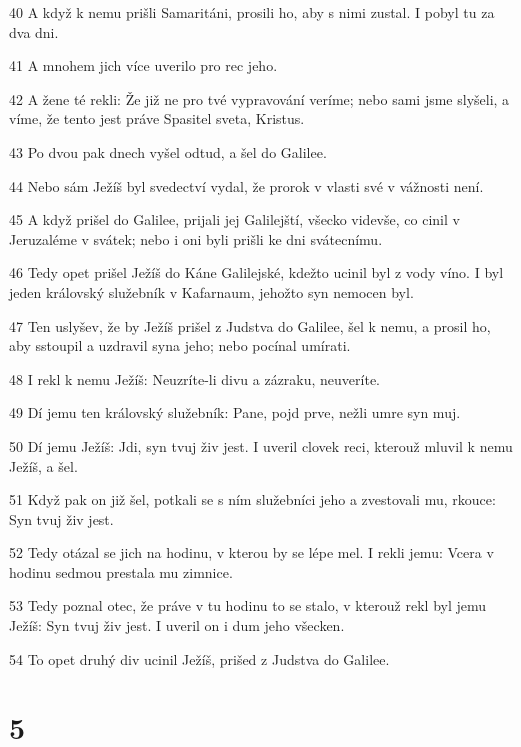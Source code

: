 \par 40 A když k nemu prišli Samaritáni, prosili ho, aby s nimi zustal. I pobyl tu za dva dni.
\par 41 A mnohem jich více uverilo pro rec jeho.
\par 42 A žene té rekli: Že již ne pro tvé vypravování veríme; nebo sami jsme slyšeli, a víme, že tento jest práve Spasitel sveta, Kristus.
\par 43 Po dvou pak dnech vyšel odtud, a šel do Galilee.
\par 44 Nebo sám Ježíš byl svedectví vydal, že prorok v vlasti své v vážnosti není.
\par 45 A když prišel do Galilee, prijali jej Galilejští, všecko videvše, co cinil v Jeruzaléme v svátek; nebo i oni byli prišli ke dni svátecnímu.
\par 46 Tedy opet prišel Ježíš do Káne Galilejské, kdežto ucinil byl z vody víno. I byl jeden královský služebník v Kafarnaum, jehožto syn nemocen byl.
\par 47 Ten uslyšev, že by Ježíš prišel z Judstva do Galilee, šel k nemu, a prosil ho, aby sstoupil a uzdravil syna jeho; nebo pocínal umírati.
\par 48 I rekl k nemu Ježíš: Neuzríte-li divu a zázraku, neuveríte.
\par 49 Dí jemu ten královský služebník: Pane, pojd prve, nežli umre syn muj.
\par 50 Dí jemu Ježíš: Jdi, syn tvuj živ jest. I uveril clovek reci, kterouž mluvil k nemu Ježíš, a šel.
\par 51 Když pak on již šel, potkali se s ním služebníci jeho a zvestovali mu, rkouce: Syn tvuj živ jest.
\par 52 Tedy otázal se jich na hodinu, v kterou by se lépe mel. I rekli jemu: Vcera v hodinu sedmou prestala mu zimnice.
\par 53 Tedy poznal otec, že práve v tu hodinu to se stalo, v kterouž rekl byl jemu Ježíš: Syn tvuj živ jest. I uveril on i dum jeho všecken.
\par 54 To opet druhý div ucinil Ježíš, prišed z Judstva do Galilee.

\chapter{5}

